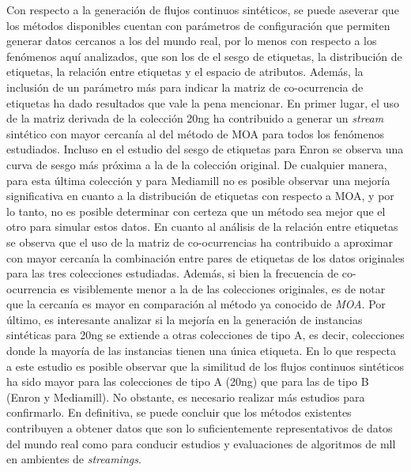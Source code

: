 Con respecto a la generación de flujos continuos sintéticos, se puede aseverar
que los métodos disponibles cuentan con parámetros de configuración que permiten
generar datos cercanos a los del mundo real, por lo menos con respecto a los
fenómenos aquí analizados, que son los de el sesgo de etiquetas, la distribución
de etiquetas, la relación entre etiquetas y el espacio de atributos.  Además, la
inclusión de un parámetro más para indicar la matriz de co-ocurrencia de
etiquetas ha dado resultados que vale la pena mencionar. En primer lugar, el uso
de la matriz derivada de la colección 20ng ha contribuido a generar un
\textit{stream} sintético con mayor cercanía al del método de MOA para todos los
fenómenos estudiados. Incluso en el estudio del sesgo de etiquetas para Enron se
observa una curva de sesgo más próxima a la de la colección original. De
cualquier manera, para esta última colección y para Mediamill no es posible
observar una mejoría significativa en cuanto a la distribución de etiquetas con
respecto a MOA, y por lo tanto, no es posible determinar con certeza que un
método sea mejor que el otro para simular estos datos. En cuanto al análisis de
la relación entre etiquetas se observa que el uso de la matriz de co-ocurrencias
ha contribuido a aproximar con mayor cercanía la combinación entre pares de
etiquetas de los datos originales para las tres colecciones estudiadas. Además,
si bien la frecuencia de co-ocurrencia es visiblemente menor a la de las
colecciones originales, es de notar que la cercanía es mayor en comparación al
método ya conocido de \textit{MOA}\@. Por último, es interesante analizar si la
mejoría en la generación de instancias sintéticas para 20ng se extiende a otras
colecciones de tipo A, es decir, colecciones donde la mayoría de las instancias
tienen una única etiqueta. En lo que respecta a este estudio es posible observar
que la similitud de los flujos continuos sintéticos ha sido mayor para las
colecciones de tipo A (20ng) que para las de tipo B (Enron y Mediamill). No
obstante, es necesario realizar más estudios para confirmarlo.  En definitiva,
se puede concluir que los métodos existentes contribuyen a obtener datos que son
lo suficientemente representativos de datos del mundo real como para conducir
estudios y evaluaciones de algoritmos de \acrshort{mll} en ambientes de
\textit{streamings}.

